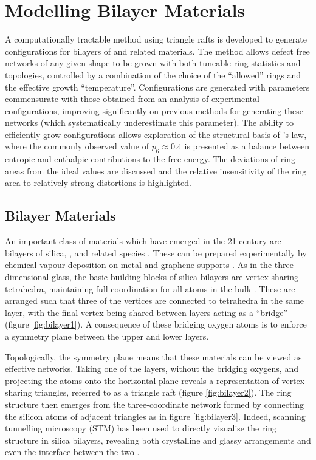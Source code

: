 \chapter[Modelling Bilayer Materials]{Modelling Bilayer Materials}
\label{ch:bilayers}

\begin{chapterabstract}
A computationally tractable \mc{} method using triangle rafts is developed to generate configurations for bilayers of \sioii{} and related materials.
The method allows defect free networks of any given shape to be grown with both tuneable ring statistics and topologies, controlled by a combination of the choice of the ``allowed'' rings and the effective growth ``temperature''. 
Configurations are generated with \aw{} parameters commensurate with those obtained from an analysis of experimental configurations, improving significantly on previous methods for generating these networks (which systematically underestimate this parameter). 
The ability to efficiently grow configurations allows exploration of the structural basis of \lm’s law, where the commonly observed value of $p_6\approx0.4$ is presented as a balance between entropic and enthalpic contributions to the free energy. 
The deviations of ring areas from the ideal values are discussed and the relative insensitivity of the ring area to relatively strong distortions is highlighted.
\end{chapterabstract}

\section{Bilayer Materials}

An important class of \td{} materials which have emerged in the 21\st{} century are bilayers of silica, \sioii, and related species \cite{Buchner2017}.
These can be prepared experimentally by chemical vapour deposition on metal and graphene supports \cite{Huang2012,Lichtenstein2012a}.
As in the three\--dimensional glass, the basic building blocks of silica bilayers are vertex sharing \sioiv{} tetrahedra, maintaining full coordination for all atoms in the bulk \cite{Wilson2013}.
These are arranged such that three of the vertices are connected to tetrahedra in the same layer, with the final vertex being shared between layers acting as a ``bridge'' (figure \ref{fig:bilayer1}).
A consequence of these bridging oxygen atoms is to enforce a symmetry plane between the upper and lower layers.

Topologically, the symmetry plane means that these materials can be viewed as effective \td{} networks.
Taking one of the layers, without the bridging oxygens, and projecting the atoms onto the horizontal plane reveals a representation of vertex sharing triangles, referred to as a triangle raft (figure \ref{fig:bilayer2}).
The ring structure then emerges from the three\--coordinate network formed by connecting the silicon atoms of adjacent triangles as in figure \ref{fig:bilayer3}.
Indeed, scanning tunnelling microscopy (STM) has been used to directly visualise the ring structure in silica bilayers, revealing both crystalline and glassy arrangements and even the interface between the two   \cite{Loffler2010,Lichtenstein2012b}.

